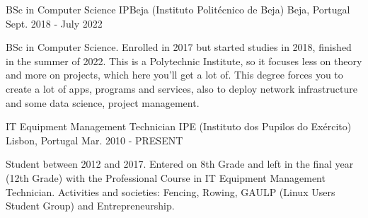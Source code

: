 


\begin{cventries}


  \cventry
  {BSc in Computer Science} %
  {IPBeja (Instituto Politécnico de Beja)} %
  {Beja, Portugal} %
  {Sept. 2018 - July 2022} %
  { %
    \begin{cvitems}
      \item {BSc in Computer Science. Enrolled in 2017 but started studies in 2018, finished in the summer of 2022.
                  This is a Polytechnic Institute, so it focuses less on theory and more on projects, which here you'll get a lot of. This degree forces you to create a lot of apps, programs and services, also to deploy network infrastructure and some data science, project management.}
    \end{cvitems}
  }

  \cventry
  {IT Equipment Management Technician} %
  {IPE (Instituto dos Pupilos do Exército)} %
  {Lisbon, Portugal} %
  {Mar. 2010 - PRESENT} %
  { %
    \begin{cvitems}
      \item {Student between 2012 and 2017. Entered on 8th Grade and left in the final year (12th Grade) with the Professional Course in IT Equipment Management Technician. Activities and societies: Fencing, Rowing, GAULP (Linux Users Student Group) and Entrepreneurship.}
    \end{cvitems}
  }


\end{cventries}
